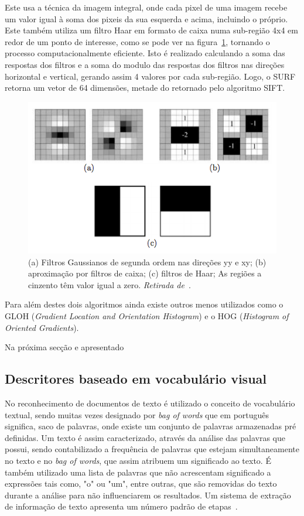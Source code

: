 Este usa a técnica da imagem integral, onde cada pixel de uma imagem recebe um valor igual à soma dos pixeis da sua esquerda e acima, incluindo o próprio. Este também utiliza um filtro Haar em formato de caixa numa sub-região 4x4 em redor de um ponto de interesse, como se pode ver na figura~\ref{fig:surf}, tornando o processo computacionalmente eficiente. Isto é realizado calculando a soma das respostas dos filtros e a soma do modulo das respostas dos filtros nas direções horizontal e vertical, gerando assim 4 valores por cada sub-região. Logo, o SURF retorna um vetor de 64 dimensões, metade do retornado pelo algoritmo SIFT.

\begin{figure}[h]
\centering
\includegraphics[width=0.7\linewidth]{./figures/surf}
\caption{ (a) Filtros Gaussianos de segunda ordem nas direções yy e xy; (b) aproximação por filtros de caixa; (c) filtros de Haar; As regiões a cinzento têm valor igual a zero. \textit{Retirada de}~\cite{Bay2006}.}
\label{fig:surf}
\end{figure}

Para além destes dois algoritmos ainda existe outros menos utilizados como o GLOH (\textit{Gradient Location and Orientation Histogram}) e o HOG (\textit{Histogram of Oriented Gradients}).

Na próxima secção e apresentado

\subsection{Descritores baseado em vocabulário visual}\label{subsec: vocab}

No reconhecimento de documentos de texto é utilizado o conceito de vocabulário textual, sendo muitas vezes designado por \textit{bag of words} que em português significa, saco de palavras, onde existe um conjunto de palavras armazenadas pré definidas. Um texto é assim caracterizado, através da análise das palavras que possui, sendo contabilizado a frequência de palavras que estejam simultaneamente no texto e no \textit{bag of words}, que assim atribuem um significado ao texto. É também utilizado uma lista de palavras que não acrescentam significado a expressões tais como, "o" ou "um", entre outras, que são removidas do texto durante a análise para não influenciarem os resultados. Um sistema de extração de informação de texto apresenta um número padrão de etapas~\cite{Baeza-Yates1999}. 

